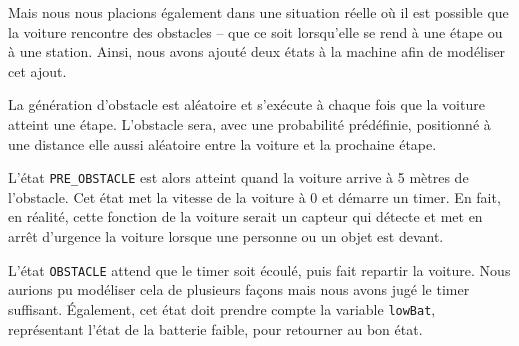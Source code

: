 \documentclass[conference]{IEEEtran}
\begin{document}
Mais nous nous placions également dans une situation réelle où il est possible que la voiture rencontre des obstacles -- que ce soit lorsqu'elle se rend à une étape ou à une station. Ainsi, nous avons ajouté deux états à la machine afin de modéliser cet ajout.

La génération d'obstacle est aléatoire et s'exécute à chaque fois que la voiture atteint une étape. L'obstacle sera, avec une probabilité prédéfinie, positionné à une distance elle aussi aléatoire entre la voiture et la prochaine étape.

L'état \texttt{PRE\_OBSTACLE} est alors atteint quand la voiture arrive à 5 mètres de l'obstacle. Cet état met la vitesse de la voiture à 0 et démarre un timer. En fait, en réalité, cette fonction de la voiture serait un capteur qui détecte et met en arrêt d'urgence la voiture lorsque une personne ou un objet est devant.

L'état \texttt{OBSTACLE} attend que le timer soit écoulé, puis fait repartir la voiture. Nous aurions pu modéliser cela de plusieurs façons mais nous avons jugé le timer suffisant. Également, cet état doit prendre compte la variable \texttt{lowBat}, représentant l'état de la batterie faible, pour retourner au bon état.
\end{document}
